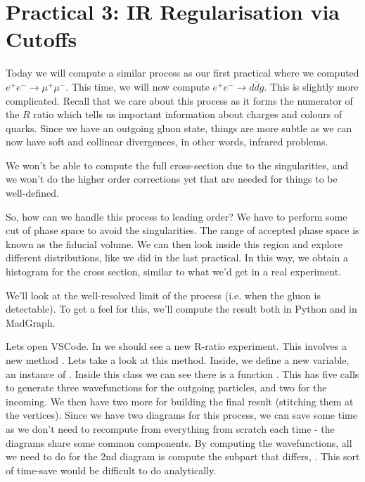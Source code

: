 \section*{Practical 3: IR Regularisation via Cutoffs }

Today we will compute a similar process as our first practical where we computed $e^+ e^-\to \mu^+\mu^-$. This time, we will now compute $e^+e^-\to d\bar{d}g$. This is slightly more complicated. Recall that we care about this process as it forms the numerator of the $R$ ratio which tells us important information about charges and colours of quarks. Since we have an outgoing gluon state, things are more subtle as we can now have soft and collinear divergences, in other words, infrared problems. 

We won't be able to compute the full cross-section due to the singularities, and we won't do the higher order corrections yet that are needed for things to be well-defined.

So, how can we handle this process to leading order? We have to perform some cut of phase space to avoid the singularities. The range of accepted phase space is known as the fiducial volume. We can then look inside this region and explore different distributions, like we did in the last practical. In this way, we obtain a histogram for the cross section, similar to what we'd get in a real experiment.


We'll look at the well-resolved limit of the process (i.e. when the gluon is detectable). To get a feel for this, we'll compute the result both in Python and in MadGraph.

Lets open VSCode. In  we should see a new R-ratio experiment. This involves a new method . Lets take a look at this method. Inside, we define a new  variable, an instance of . Inside this class we can see there is a function .
This has five calls to generate three wavefunctions for the outgoing particles, and two for the incoming. We then have two more for building the final result (stitching them at the vertices). Since we have two diagrams for this process, we can save some time as we don't need to recompute from everything from scratch each time - the diagrams share some common components. By computing the wavefunctions, all we need to do for the 2nd diagram is compute the subpart that differs, . This sort of time-save would be difficult to do analytically.

